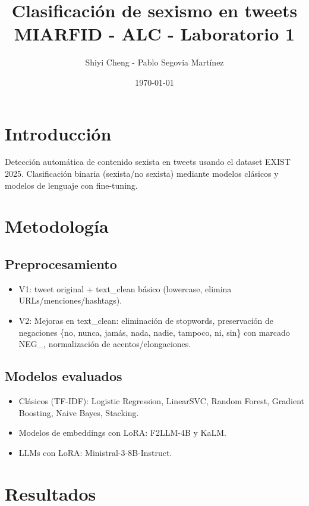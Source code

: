 \documentclass[11pt,a4paper]{article}
\title{%
    \huge Clasificación de sexismo en tweets\\[0.2cm]
    \large{MIARFID - ALC - Laboratorio 1}
}
\author{Shiyi Cheng - Pablo Segovia Martínez}
\date{\today}
\begin{document}
\maketitle

\section{Introducción}

Detección automática de contenido sexista en tweets usando el dataset EXIST 2025. Clasificación binaria (sexista/no sexista) mediante modelos clásicos y modelos de lenguaje con fine-tuning.

\section{Metodología}

\subsection{Preprocesamiento}

\begin{itemize}
    \item V1: tweet original + text\_clean básico (lowercase, elimina URLs/menciones/hashtags).

    \item V2: Mejoras en text\_clean: eliminación de stopwords, preservación de negaciones \{no, nunca, jamás, nada, nadie, tampoco, ni, sin\} con marcado NEG\_, normalización de acentos/elongaciones.
\end{itemize}

\subsection{Modelos evaluados}
\begin{itemize}
    \item Clásicos (TF-IDF): Logistic Regression, LinearSVC, Random Forest, Gradient Boosting, Naive Bayes, Stacking.
    \item Modelos de embeddings con LoRA: F2LLM-4B y KaLM.
    \item LLMs con LoRA: Ministral-3-8B-Instruct.
\end{itemize}

\clearpage

\section{Resultados}
\end{document}
